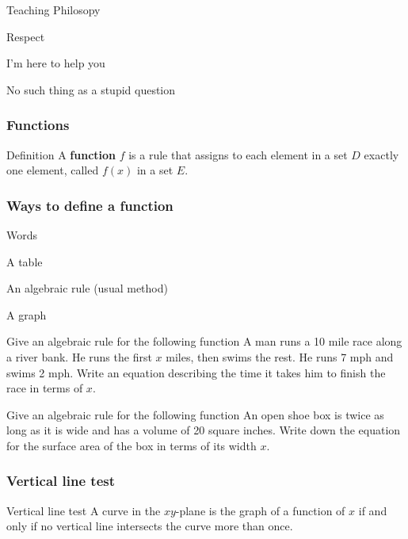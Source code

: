 \documentclass[t]{beamer}
\newenvironment{fpi}
  {\itemize[nolistsep,itemsep=\fill]}
  {\vfill\enditemize}
\begin{document}
\begin{frame}{Teaching Philosopy}
\begin{fpi}
\item Respect
\item I'm here to help you
\item No such thing as a stupid question
\end{fpi}
\end{frame}

\begin{frame}
\frametitle{Functions}
\begin{block}{Definition}
A \textbf{function} $f$ is a rule that assigns to each element in a set $D$ exactly one element, called $f(x)$
in a set $E$.
\end{block}
\end{frame}


\begin{frame}
\frametitle{Ways to define a function}
\begin{fpi}
\item Words  
\item A table  
\item An algebraic rule  (usual method)
\item A graph
\end{fpi}
\end{frame}

\begin{frame}{Give an algebraic rule for the following function}
A man runs a 10 mile race along a river
bank. He runs the first $x$ miles, then swims
the rest. He runs 7 mph and swims 2 mph.
Write an equation describing the time it
takes him to finish the race in terms of $x$.
\end{frame}


\begin{frame}{Give an algebraic rule for the following function}
An open shoe box is twice as long as it is
wide and has a volume of 20 square inches.
Write down the equation for the surface
area of the box in terms of its width $x$.
\end{frame}

\begin{frame}
\frametitle{Vertical line test}
\begin{block}{Vertical line test}
A curve in the $xy$-plane is the graph of a function of $x$ if and only if
no vertical line intersects the curve more than once.
\end{block}
\end{frame}
\end{document}
